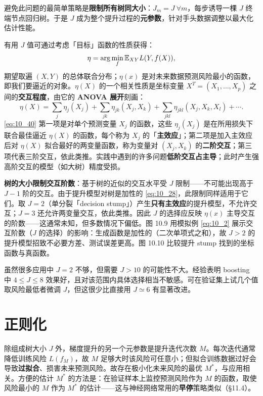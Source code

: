 避免此问题的最简单策略是\textbf{限制所有树同大小}：$J_m = J\ \forall m$，每步诱导一棵 $J$ 终端节点回归树。于是 $J$ 成为整个提升过程的\textbf{元参数}，针对手头数据调整以最大化估计性能。

有用 $J$ 值可通过考虑「目标」函数的性质获得：
\begin{equation}\label{eq:10_39}
    \eta = \arg\min_{f} \mathbb{E}_{XY} L(Y, f(X)),
\end{equation}
期望取遍 $(X, Y)$ 的总体联合分布；$\eta(x)$ 是对未来数据预测风险最小的函数，即我们要逼近的对象。$\eta(X)$ 的一个相关性质是坐标变量 $X^T = (X_1, \ldots, X_p)$ 之间的\textbf{交互程度}，由它的 \textbf{ANOVA 展开}刻画：
\begin{equation}\label{eq:10_40}
    \eta(X) = \sum_{j} \eta_j(X_j) + \sum_{jk} \eta_{jk}(X_j, X_k) + \sum_{jkl} \eta_{jkl}(X_j, X_k, X_l) + \cdots.
\end{equation}
\eqref{eq:10_40} 第一项是对单个预测变量 $X_j$ 的函数，这些 $\eta_j(X_j)$ 是在所用损失下联合最佳逼近 $\eta(X)$ 的函数，每个称为 $X_j$ 的「\textbf{主效应}」；第二项是加入主效应后对 $\eta(X)$ 拟合最好的两变量函数，称为变量对 $(X_j, X_k)$ 的\textbf{二阶交互}；第三项代表三阶交互，依此类推。实践中遇到的许多问题\textbf{低阶交互占主导}；此时产生强高阶交互的模型（如大树）精度受损。

\textbf{树的大小限制交互阶数}：基于树的近似的交互水平受 $J$ 限制——不可能出现高于 $J-1$ 阶的交互。由于提升模型对树是加性的 \eqref{eq:10_28}，此限制同样适用于它们。取 $J = 2$（单分裂「decision stump」）产生\textbf{只有主效应}的提升模型，不允许交互；$J = 3$ 还允许两变量交互，依此类推。因此 $J$ 的选择应反映 $\eta(x)$ 主导交互的阶数——这通常未知，但多数情况下偏低。图 10.9 用模拟例 \eqref{eq:10_2} 展示交互阶数（$J$ 的选择）的影响：生成函数是加性的（二次单项式之和），故 $J > 2$ 的提升模型招致不必要方差、测试误差更高。图 10.10 比较提升 stump 找到的坐标函数与真函数。

虽然很多应用中 $J = 2$ 不够，但需要 $J > 10$ 的可能性不大。经验表明 boosting 中 $4 \le J \le 8$ 效果好，且对该范围内具体选择相当不敏感。可在验证集上试几个值取风险最低者微调 $J$，但这很少比直接用 $J \simeq 6$ 有显著改进。

\section{正则化}

除组成树大小 $J$ 外，梯度提升的另一个元参数是提升迭代次数 $M$。每次迭代通常降低训练风险 $L(f_M)$，故 $M$ 足够大时该风险可任意小；但拟合训练数据过好会导致\textbf{过拟合}、损害未来预测风险。故存在极小化未来风险的最优 $M^*$，与应用相关。方便的估计 $M^*$ 的方法是：在验证样本上监控预测风险作为 $M$ 的函数，取使风险最小的 $M$ 作为 $M^*$ 的估计——这与神经网络常用的\textbf{早停}策略类似（§11.4）。


